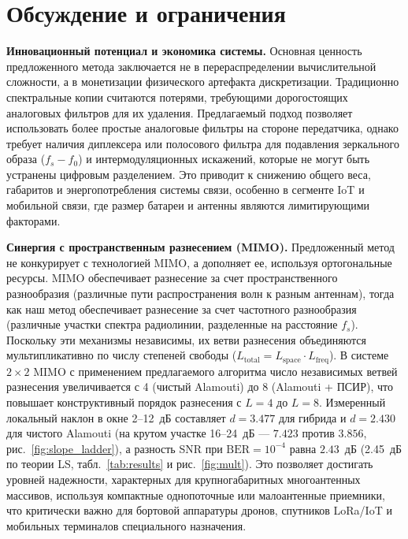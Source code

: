 \documentclass[a4paper,12pt]{article}
\numberwithin{equation}{section}
\newcommand{\BER}{\mathrm{BER}}
\begin{document}
\section{Обсуждение и ограничения}

\textbf{Инновационный потенциал и экономика системы.}
Основная ценность предложенного метода заключается не в перераспределении вычислительной сложности, а в монетизации физического артефакта дискретизации. Традиционно спектральные копии считаются потерями, требующими дорогостоящих аналоговых фильтров для их удаления. Предлагаемый подход позволяет использовать более простые аналоговые фильтры на стороне передатчика, однако требует наличия диплексера или полосового фильтра для подавления зеркального образа ($f_s-f_0$) и интермодуляционных искажений, которые не могут быть устранены цифровым разделением. Это приводит к снижению общего веса, габаритов и энергопотребления системы связи, особенно в сегменте IoT и мобильной связи, где размер батареи и антенны являются лимитирующими факторами.

\textbf{Синергия с пространственным разнесением (MIMO).}
Предложенный метод не конкурирует с технологией MIMO, а дополняет ее, используя ортогональные ресурсы. MIMO обеспечивает разнесение за счет пространственного разнообразия (различные пути распространения волн к разным антеннам), тогда как наш метод обеспечивает разнесение за счет частотного разнообразия (различные участки спектра радиолинии, разделенные на расстояние $f_s$). Поскольку эти механизмы независимы, их ветви разнесения объединяются мультипликативно по числу степеней свободы ($L_{\text{total}} = L_{\text{space}} \cdot L_{\text{freq}}$). В системе $2 \times 2$ MIMO с применением предлагаемого алгоритма число независимых ветвей разнесения увеличивается с 4 (чистый Alamouti) до 8 (Alamouti + ПСИР), что повышает конструктивный порядок разнесения с $L=4$ до $L=8$. Измеренный локальный наклон в окне 2--12~дБ составляет $d=3.477$ для гибрида и $d=2.430$ для чистого Alamouti (на крутом участке 16--24~дБ --- $7.423$ против $3.856$, рис.~\ref{fig:slope_ladder}), а разность SNR при $\BER=10^{-4}$ равна $\mathbf{2.43}$~дБ (2.45~дБ по теории LS, табл.~\ref{tab:results} и рис.~\ref{fig:mult}). Это позволяет достигать уровней надежности, характерных для крупногабаритных многоантенных массивов, используя компактные однопоточные или малоантенные приемники, что критически важно для бортовой аппаратуры дронов, спутников LoRa/IoT и мобильных терминалов специального назначения.
\end{document}
